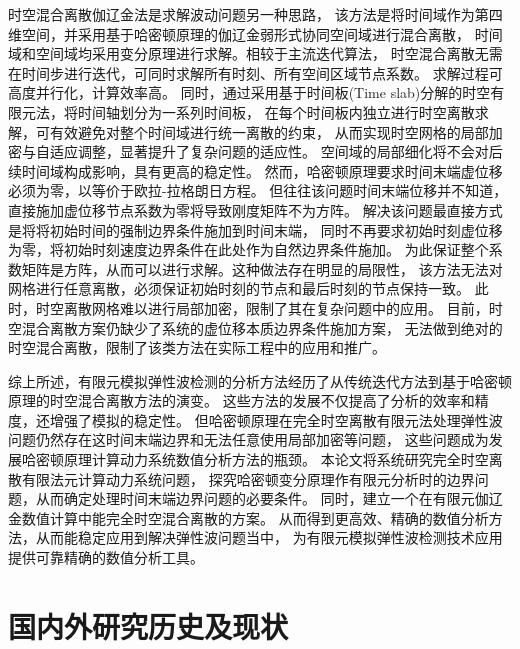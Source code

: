 时空混合离散伽辽金法\cite{hughesFinite}是求解波动问题另一种思路，
该方法是将时间域作为第四维空间，并采用基于哈密顿原理的伽辽金弱形式协同空间域进行混合离散，
时间域和空间域均采用变分原理进行求解。相较于主流迭代算法，
时空混合离散无需在时间步进行迭代，可同时求解所有时刻、所有空间区域节点系数。
求解过程可高度并行化，计算效率高。
同时，通过采用基于时间板(Time slab)分解的时空有限元法，将时间轴划分为一系列时间板，
在每个时间板内独立进行时空离散求解，可有效避免对整个时间域进行统一离散的约束，
从而实现时空网格的局部加密与自适应调整，显著提升了复杂问题的适应性。
空间域的局部细化将不会对后续时间域构成影响，具有更高的稳定性。
然而，哈密顿原理要求时间末端虚位移必须为零，以等价于欧拉-拉格朗日方程\cite{arnold1978}。
但往往该问题时间末端位移并不知道，直接施加虚位移节点系数为零将导致刚度矩阵不为方阵\cite{haire2006b}。
解决该问题最直接方式是将将初始时间的强制边界条件施加到时间末端，
同时不再要求初始时刻虚位移为零，将初始时刻速度边界条件在此处作为自然边界条件施加。
为此保证整个系数矩阵是方阵，从而可以进行求解\cite{peters1988}。这种做法存在明显的局限性，
该方法无法对网格进行任意离散，必须保证初始时刻的节点和最后时刻的节点保持一致。
此时，时空离散网格难以进行局部加密，限制了其在复杂问题中的应用。
目前，时空混合离散方案仍缺少了系统的虚位移本质边界条件施加方案，
无法做到绝对的时空混合离散，限制了该类方法在实际工程中的应用和推广。

综上所述，有限元模拟弹性波检测的分析方法经历了从传统迭代方法到基于哈密顿原理的时空混合离散方法的演变。
这些方法的发展不仅提高了分析的效率和精度，还增强了模拟的稳定性。
但哈密顿原理在完全时空离散有限元法处理弹性波问题仍然存在这时间末端边界和无法任意使用局部加密等问题，
这些问题成为发展哈密顿原理计算动力系统数值分析方法的瓶颈。
本论文将系统研究完全时空离散有限法元计算动力系统问题，
探究哈密顿变分原理作有限元分析时的边界问题，从而确定处理时间末端边界问题的必要条件。
同时，建立一个在有限元伽辽金数值计算中能完全时空混合离散的方案。
从而得到更高效、精确的数值分析方法，从而能稳定应用到解决弹性波问题当中，
为有限元模拟弹性波检测技术应用提供可靠精确的数值分析工具。
\section{国内外研究历史及现状}

